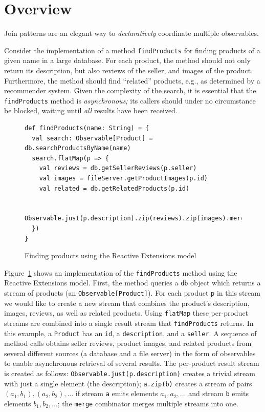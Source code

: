 \documentclass[runningheads]{llncs}
\begin{document}
\begin{sloppypar}
\section{Overview}

Join patterns are an elegant way to {\em declaratively} coordinate multiple
observables.

Consider the implementation of a method \verb|findProducts| for finding
products of a given name in a large database. For each product, the method
should not only return its description, but also reviews of the seller, and
images of the product. Furthermore, the method should find ``related''
products, e.g., as determined by a recommender system. Given the complexity of
the search, it is essential that the \verb|findProducts| method is {\em
asynchronous;} its callers should under no circumstance be blocked, waiting
until {\em all} results have been received.

\begin{figure}[ht]
\centering
\lstset{numbers=left}
\begin{lstlisting}
def findProducts(name: String) = {
  val search: Observable[Product] = db.searchProductsByName(name)
  search.flatMap(p => {
    val reviews = db.getSellerReviews(p.seller)
    val images = fileServer.getProductImages(p.id)
    val related = db.getRelatedProducts(p.id)

    Observable.just(p.description).zip(reviews).zip(images).merge(related)
  })
}
\end{lstlisting}
\caption{Finding products using the Reactive Extensions model}
\label{fig:find-products}
\end{figure}

Figure~\ref{fig:find-products} shows an implementation of the
\verb|findProducts| method using the Reactive Extensions model. First, the
method queries a \verb|db| object which returns a stream of products (an
\verb|Observable[Product]|). For each product \verb|p| in this stream we would
like to create a new stream that combines the product's description, images,
reviews, as well as related products. Using \verb|flatMap| these per-product
streams are combined into a single result stream that \verb|findProducts|
returns. In this example, a \verb|Product| has an \verb|id|, a
\verb|description|, and a \verb|seller|. A sequence of method calls obtains
seller reviews, product images, and related products from several different
sources (a database and a file server) in the form of observables to enable
asynchronous retrieval of several results. The per-product result stream is
created as follows: \verb|Observable.just(p.description)| creates a trivial
stream with just a single element (the description); \verb|a.zip(b)| creates a
stream of pairs $(a_1, b_1), (a_2, b_2), \ldots$ if stream \verb|a| emits
elements $a_1, a_2, \ldots$ and stream \verb|b| emits elements $b_1, b_2,
\ldots$; the \verb|merge| combinator merges multiple streams into one.


\end{sloppypar}
\end{document}
